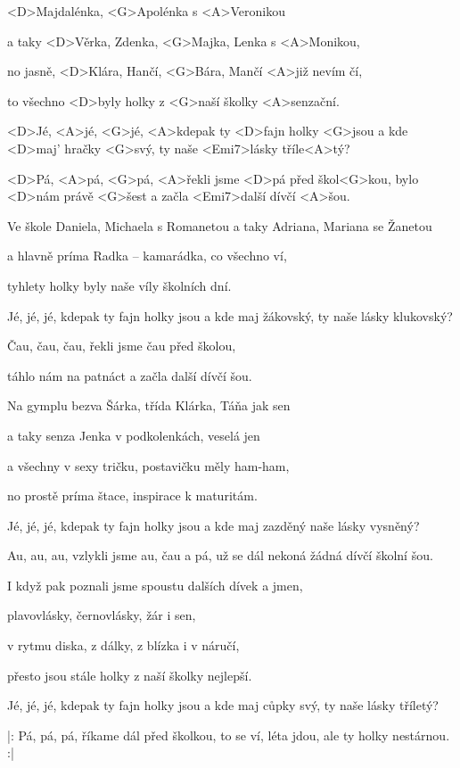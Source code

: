 

\zs
<D>Majdalénka, <G>Apolénka s <A>Veronikou

a taky <D>Věrka, Zdenka, <G>Majka, Lenka s <A>Monikou,

no jasně, <D>Klára, Hančí, <G>Bára, Mančí <A>již nevím čí,

to všechno <D>byly holky z <G>naší školky <A>senzační.
\ks

\zr
<D>Jé, <A>jé, <G>jé,
<A>kdepak ty <D>fajn holky <G>jsou
a kde <D>maj' hračky <G>svý,
ty naše <Emi7>lásky tříle<A>tý?

<D>Pá, <A>pá, <G>pá,
<A>řekli jsme <D>pá před škol<G>kou,
bylo <D>nám právě <G>šest
a začla <Emi7>další dívčí <A>šou.
\kr

\zs
Ve škole Daniela, Michaela s Romanetou
a taky Adriana, Mariana se Žanetou

a hlavně príma Radka – kamarádka, co všechno ví,

tyhlety holky byly naše víly školních dní.
\ks

\zr
Jé, jé, jé,
kdepak ty fajn holky jsou
a kde maj žákovský,
ty naše lásky klukovský?

Čau, čau, čau,
řekli jsme čau před školou,

táhlo nám na patnáct
a začla další dívčí šou.
\kr

\zs
Na gymplu bezva Šárka, třída Klárka, Táňa jak sen

a taky senza Jenka v podkolenkách, veselá jen

a všechny v sexy tričku, postavičku měly ham-ham,

no prostě príma štace, inspirace k maturitám.
\ks

\zr
Jé, jé, jé,
kdepak ty fajn holky jsou
a kde maj zazděný
naše lásky vysněný?

Au, au, au,
vzlykli jsme au, čau a pá,
už se dál nekoná
žádná dívčí školní šou.
\kr

\zs
I když pak poznali jsme spoustu dalších dívek a jmen,

plavovlásky, černovlásky, žár i sen,

v rytmu diska, z dálky, z blízka i v náručí,

přesto jsou stále holky z naší školky nejlepší.
\ks

\zr
Jé, jé, jé,
kdepak ty fajn holky jsou
a kde maj cůpky svý,
ty naše lásky tříletý?

|: Pá, pá, pá,
říkame dál před školkou,
to se ví, léta jdou,
ale ty holky nestárnou. :|
\kr

\kp
